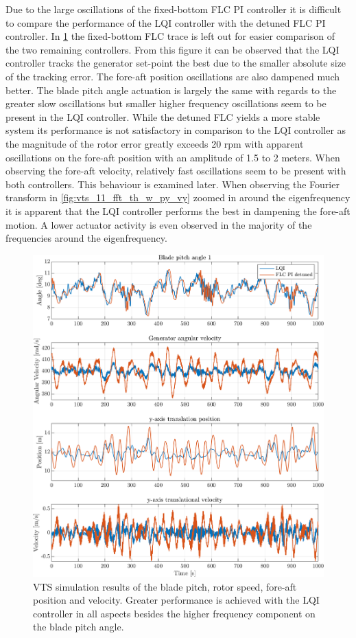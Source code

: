 Due to the large oscillations of the fixed-bottom FLC PI controller it is difficult to compare the performance of the LQI controller with the detuned FLC PI controller. In \cref{fig:vts_10_th_w_py_vy} the fixed-bottom FLC trace is left out for easier comparison of the two remaining controllers. From this figure it can be observed that the LQI controller tracks the generator set-point the best due to the smaller absolute size of the tracking error. The fore-aft position oscillations are also dampened much better. The blade pitch angle actuation is largely the same with regards to the greater slow oscillations but smaller higher frequency oscillations seem to be present in the LQI controller. While the detuned FLC yields a more stable system its performance is not satisfactory in comparison to the LQI controller as the magnitude of the rotor error greatly exceeds 20 rpm with apparent oscillations on the fore-aft position with an amplitude of 1.5 to 2 meters. When observing the fore-aft velocity, relatively fast oscillations seem to be present with both controllers. This behaviour is examined later. When observing the Fourier transform in \cref{fig:vts_11_fft_th_w_py_vy} zoomed in around the eigenfrequency it is apparent that the LQI controller performs the best in dampening the fore-aft motion. A lower actuator activity is even observed in the majority of the frequencies around the eigenfrequency.
\begin{figure}[h]
	\centering
	\includegraphics[width=0.7\linewidth]{Graphics/TestResults/VTSplotting/10_th_w_py_vy.png}
	\caption{VTS simulation results of the blade pitch, rotor speed, fore-aft position and velocity. Greater performance is achieved with the LQI controller in all aspects besides the higher frequency component on the blade pitch angle.}
	\label{fig:vts_10_th_w_py_vy}
\end{figure}

